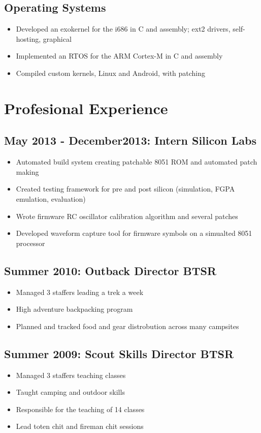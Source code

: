 \documentclass[a4paper,10pt]{article}
\begin{document}
\subsection{Operating Systems}
\begin{itemize}
  \item
    Developed an exokernel for the i686 in C and assembly; ext2 drivers, self-hosting, graphical
  \item
    Implemented an RTOS for the ARM Cortex-M in C and assembly
  \item
    Compiled custom kernels, Linux and Android, with patching
\end{itemize}

\section{Profesional Experience}
\subsection{May 2013 - December2013: Intern Silicon Labs}
\begin{itemize}
  \item
    Automated build system creating patchable 8051 ROM and automated patch making
  \item
    Created testing framework for pre and post silicon (simulation, FGPA emulation, evaluation)
  \item
    Wrote firmware RC oscillator calibration algorithm and several patches
  \item
    Developed waveform capture tool for firmware symbols on a simualted 8051 processor
\end{itemize}

\subsection{Summer 2010: Outback Director BTSR}
\begin{itemize}
  \item
    Managed 3 staffers leading a trek a week
  \item
    High adventure backpacking program
  \item
    Planned and tracked food and gear distrobution across many campsites
\end{itemize}

\subsection{Summer 2009: Scout Skills Director BTSR}
\begin{itemize}
  \item
    Managed 3 staffers teaching classes
  \item
    Taught camping and outdoor skills
  \item
    Responsible for the teaching of 14 classes
  \item
    Lead toten chit and fireman chit sessions
\end{itemize}
\end{document}

